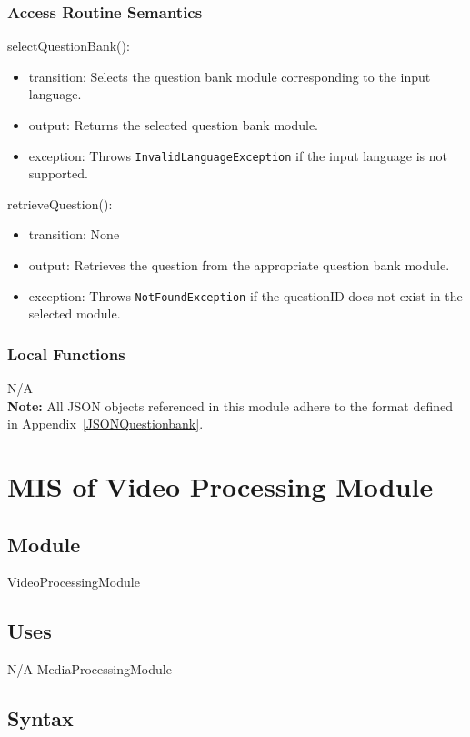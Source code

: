 \documentclass[12pt, titlepage]{article}
\begin{document}
\subsubsection{Access Routine Semantics}

\noindent selectQuestionBank():
\begin{itemize}
\item transition: Selects the question bank module corresponding to the input language.
\item output: Returns the selected question bank module.
\item exception: Throws \texttt{InvalidLanguageException} if the input language is not supported.
\end{itemize}

\noindent retrieveQuestion():
\begin{itemize}
\item transition: None
\item output: Retrieves the question from the appropriate question bank module.
\item exception: Throws \texttt{NotFoundException} if the questionID does not exist in the selected module.
\end{itemize}

\subsubsection{Local Functions}
N/A\\

\noindent \textbf{Note:} All JSON objects referenced in this module adhere to the format defined in Appendix~\ref{JSONQuestionbank}.

\section{MIS of Video Processing Module} \label{VideoProcessingModule}

\subsection{Module}
VideoProcessingModule

\subsection{Uses}
N/A
MediaProcessingModule

\subsection{Syntax}
\end{document}
